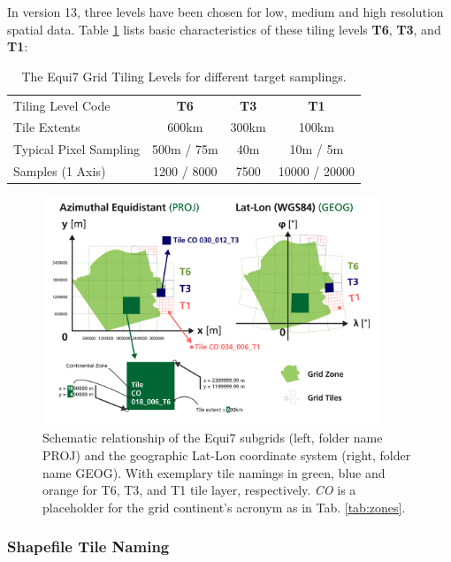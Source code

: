 \documentclass[10pt,a4paper]{article}
\begin{document}
In version 13, three levels have been chosen for low, medium and high resolution spatial data. Table \ref{tab:tilelevels} lists basic characteristics of these tiling levels \textbf{T6}, \textbf{T3}, and \textbf{T1}:

\begin{table}[hbtp]
\caption[Tile Levels]{
The Equi7 Grid Tiling Levels for different target samplings.
}
\centering
	{
	\begin{tabular}{lccc}
	\hline 
	Tiling Level Code & \textbf{T6} & \textbf{T3} & \textbf{T1} \\ 
	Tile Extents & 600km & 300km & 100km \\
	Typical Pixel Sampling & 500m / 75m & 40m & 10m / 5m \\ 
	Samples (1 Axis) & 1200 / 8000 & 7500 & 10000 / 20000 \\ 
	\hline 
	\end{tabular}	
	}
\label{tab:tilelevels}
\end{table}




\begin{figure}[hbtp]
\centering
\includegraphics[width=0.9\textwidth]{equi7_v13_tiling}
\caption{
Schematic relationship of the Equi7 subgrids (left, folder name PROJ) and the geographic Lat-Lon coordinate system (right, folder name GEOG). With exemplary tile namings in green, blue and orange for T6, T3, and T1 tile layer, respectively. \textsl{CO} is a placeholder for the grid continent's acronym as in Tab. \ref{tab:zones}.
}
\label{fig:tiling}
\end{figure}

\subsubsection*{Shapefile Tile Naming}
\end{document}
